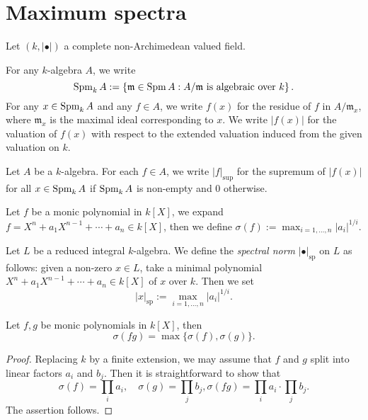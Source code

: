 \section{Maximum spectra}
Let $(k,|\bullet|)$ a complete non-Archimedean valued field.

\begin{definition}
    For any $k$-algebra $A$, we write
    \[
      \operatorname{Spm}_k A:=\left\{\mathfrak{m}\in \operatorname{Spm} A:A/\mathfrak{m}\text{ is algebraic over }k\right\}.  
    \]
    For any $x\in \operatorname{Spm}_k A$ and any $f\in A$, we write $f(x)$ for the residue of $f$ in $A/\mathfrak{m}_x$, where $\mathfrak{m}_x$ is the maximal ideal corresponding to $x$. We write $|f(x)|$ for the valuation of $f(x)$ with respect to the extended valuation induced from the given valuation on $k$.
\end{definition}

\begin{definition}
    Let $A$ be a $k$-algebra.
    For each $f\in A$, we write $|f|_{\sup}$ for the supremum of $|f(x)|$ for all $x\in \operatorname{Spm}_k A$ if $\operatorname{Spm}_k A$ is non-empty and $0$ otherwise.
\end{definition}

\begin{definition}
    Let $f$ be a monic polynomial in $k[X]$, we expand $f=X^n+a_{1}X^{n-1}+\cdots +a_n\in k[X]$, then we define $\sigma(f):=\max_{i=1,\ldots,n}|a_i|^{1/i}$.
\end{definition}

\begin{definition}
    Let $L$ be a reduced integral $k$-algebra. We define the \emph{spectral norm} $|\bullet|_{\mathrm{sp}}$ on $L$ as follows: given a non-zero $x\in L$, take a minimal polynomial $X^n+a_1X^{n-1}+\cdots+a_n\in k[X]$ of $x$ over $k$. Then we set
    \[
      |x|_{\mathrm{sp}}:=\max_{i=1,\ldots,n} |a_i|^{1/i}.  
    \]
\end{definition}



\begin{proposition}\label{prop-sigmaproduct}
    Let $f,g$ be monic polynomials in $k[X]$, then
    \[
        \sigma(fg)=\max\{\sigma(f),\sigma(g)\}.    
    \]
\end{proposition}
\begin{proof}
     Replacing $k$ by a finite extension, we may assume that $f$ and $g$ split into linear factors $a_i$ and $b_j$. Then it is straightforward to show that
     \[
       \sigma(f)=\prod_i a_i,\quad \sigma(g)=\prod_j b_j, \sigma(fg)= \prod_i a_i \cdot \prod_j b_j.
     \]
     The assertion follows.
\end{proof}


